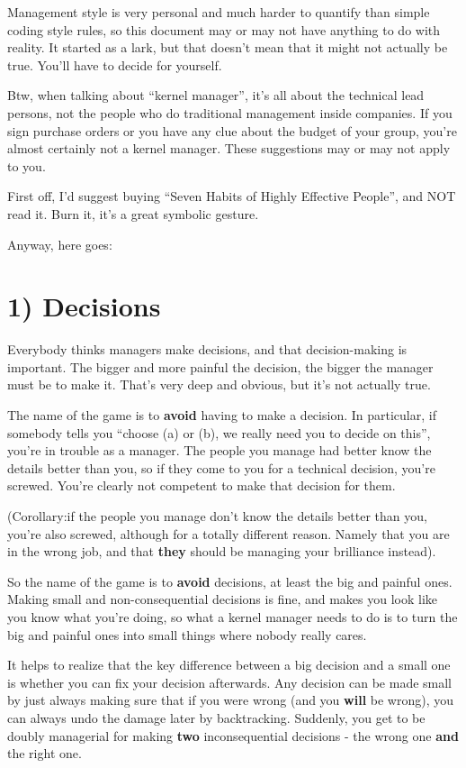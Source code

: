 \documentclass[a4paper,8pt,english]{sphinxmanual}
\begin{document}
Management style is very personal and much harder to quantify than
simple coding style rules, so this document may or may not have anything
to do with reality.  It started as a lark, but that doesn't mean that it
might not actually be true. You'll have to decide for yourself.

Btw, when talking about ``kernel manager'', it's all about the technical
lead persons, not the people who do traditional management inside
companies.  If you sign purchase orders or you have any clue about the
budget of your group, you're almost certainly not a kernel manager.
These suggestions may or may not apply to you.

First off, I'd suggest buying ``Seven Habits of Highly Effective
People'', and NOT read it.  Burn it, it's a great symbolic gesture.

Anyway, here goes:


\section{1) Decisions}
\label{process/management-style:id2}\label{process/management-style:decisions}
Everybody thinks managers make decisions, and that decision-making is
important.  The bigger and more painful the decision, the bigger the
manager must be to make it.  That's very deep and obvious, but it's not
actually true.

The name of the game is to \textbf{avoid} having to make a decision.  In
particular, if somebody tells you ``choose (a) or (b), we really need you
to decide on this'', you're in trouble as a manager.  The people you
manage had better know the details better than you, so if they come to
you for a technical decision, you're screwed.  You're clearly not
competent to make that decision for them.

(Corollary:if the people you manage don't know the details better than
you, you're also screwed, although for a totally different reason.
Namely that you are in the wrong job, and that \textbf{they} should be managing
your brilliance instead).

So the name of the game is to \textbf{avoid} decisions, at least the big and
painful ones.  Making small and non-consequential decisions is fine, and
makes you look like you know what you're doing, so what a kernel manager
needs to do is to turn the big and painful ones into small things where
nobody really cares.

It helps to realize that the key difference between a big decision and a
small one is whether you can fix your decision afterwards.  Any decision
can be made small by just always making sure that if you were wrong (and
you \textbf{will} be wrong), you can always undo the damage later by
backtracking.  Suddenly, you get to be doubly managerial for making
\textbf{two} inconsequential decisions - the wrong one \textbf{and} the right one.
\end{document}
